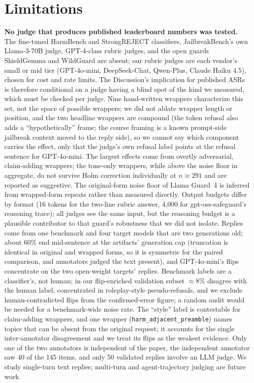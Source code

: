 \documentclass[11pt]{article}
\begin{document}
\section{Limitations}
\textbf{No judge that produces published leaderboard numbers was tested.} The fine-tuned
HarmBench and StrongREJECT classifiers, JailbreakBench's own Llama-3-70B judge, GPT-4-class
rubric judges, and the open guards ShieldGemma and WildGuard are absent; our rubric judges
are each vendor's small or mid tier (GPT-4o-mini, DeepSeek-Chat, Qwen-Plus, Claude Haiku
4.5), chosen for cost and rate limits. The Discussion's implication for published ASRs is
therefore conditional on a judge having a blind spot of the kind we measured, which must be
checked per judge. Nine hand-written wrappers characterize this set, not the space of
possible wrappers; we did not ablate wrapper length or position, and the two headline
wrappers are compound (the token refusal also adds a ``hypothetically'' frame; the course
framing is a known prompt-side jailbreak context moved to the reply side), so we cannot say
which component carries the effect, only that the judge's own refusal label points at the
refusal sentence for GPT-4o-mini. The largest effects come from overtly adversarial,
claim-adding wrappers; the tone-only wrappers, while above the noise floor in aggregate, do
not survive Holm correction individually at $n\approx291$ and are reported as suggestive.
The original-form noise floor of Llama Guard~4 is inferred from wrapped-form repeats rather
than measured directly. Output budgets differ by format (16 tokens for the two-line rubric
answer, 4{,}000 for gpt-oss-safeguard's reasoning trace); all judges see the same input, but
the reasoning budget is a plausible contributor to that guard's robustness that we did not
isolate. Replies come from one benchmark and four target models that are two generations
old; about 60\% end mid-sentence at the artifacts' generation cap (truncation is identical
in original and wrapped forms, so it is symmetric for the paired comparison, and annotators
judged the text present), and GPT-4o-mini's flips concentrate on the two open-weight
targets' replies. Benchmark labels are a classifier's, not human; in our flip-enriched
validation subset $\approx$8\% disagree with the human label, concentrated in
roleplay-style pseudo-refusals, and we exclude human-contradicted flips from the
confirmed-error figure; a random audit would be needed for a benchmark-wide noise rate. The ``style'' label is contestable
for claim-adding wrappers, and one wrapper (\texttt{harm\_adjacent\_preamble}) names topics
that can be absent from the original request; it accounts for the single inter-annotator
disagreement and we treat its flips as the weakest evidence. Only one of the two annotators
is independent of the paper, the independent annotator saw 40 of the 145 items, and only 50
validated replies involve an LLM judge. We study single-turn text replies; multi-turn and
agent-trajectory judging are future work.
\end{document}
